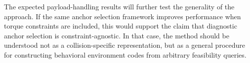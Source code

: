 The expected payload-handling results will further test the generality of the approach. If the same anchor selection framework improves performance when torque constraints are included, this would support the claim that diagnostic anchor selection is constraint-agnostic. In that case, the method should be understood not as a collision-specific representation, but as a general procedure for constructing behavioral environment codes from arbitrary feasibility queries.